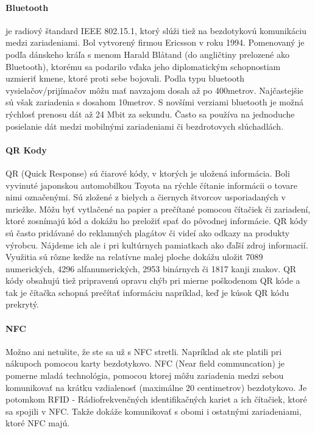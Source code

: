 \paragraph{Bluetooth} je radiový štandard IEEE 802.15.1, ktorý slúži tiež na bezdotykovú komunikáciu medzi zariadeniami. Bol vytvorený firmou Ericsson v roku 1994. Pomenovaný je podľa dánskeho kráľa s menom Harald Blåtand (do angličtiny prelozené ako Bluetooth), ktorému sa podarilo vďaka jeho diplomatickým schopnostiam uzmieriť kmene, ktoré proti sebe bojovali. Podla typu bluetooth vysielačov/prijímačov môžu mať navzajom dosah až po 400metrov. Najčastejšie sú však zariadenia s dosahom 10metrov. S novšími verziami bluetooth je možná rýchlosť prenosu dát až 24 Mbit za sekundu. Často sa používa na jednoduche posielanie dát medzi mobilnými zariadeniami či bezdrotovych slúchadlách. 


\paragraph{QR Kody} QR (Quick Response) sú čiarové kódy, v ktorých je uložená informácia. Boli vyvinuté japonskou automobilkou Toyota na rýchle čítanie informácii o tovare nimi označenými. Sú zložené z bielych a čiernych štvorcov usporiadaných v mriežke. Môžu byť vytlačené na papier a prečítané pomocou čítačiek či zariadení, ktoré zosnímajú kód a dokážu ho preložiť spať do pôvodnej informácie.  QR kódy sú často pridávané do reklamných plagátov či videí ako odkazy na produkty výrobcu. Nájdeme ich ale i pri kultúrnych pamiatkach ako ďaľší zdroj informacií. Využitia sú rôzne kedže na relatívne malej ploche dokážu uložit 7089 numerických, 4296 alfanumerických, 2953 binárnych či 1817 kanji znakov. QR kódy obsahujú tiež pripravenú opravu chýb pri mierne poškodenom QR kóde a tak je čítačka schopná prečítať informáciu napríklad, keď je kúsok QR kódu prekrytý. 

\paragraph{NFC} Možno ani netušite, že ste sa už s NFC stretli. Napríklad ak ste platili pri nákupoch pomocou karty bezdotykovo. NFC (Near field communcation) je pomerne mladá technológia, pomocou ktorej môžu zariadenia medzi sebou komunikovať na krátku vzdialenosť (maximálne 20 centimetrov) bezdotykovo. Je potomkom RFID - Rádiofrekvenčných identifikačných kariet a ich čítačiek, ktoré sa spojili v NFC. Takže dokáže komunikovať s obomi i ostatnými zariadeniami, ktoré NFC majú.



